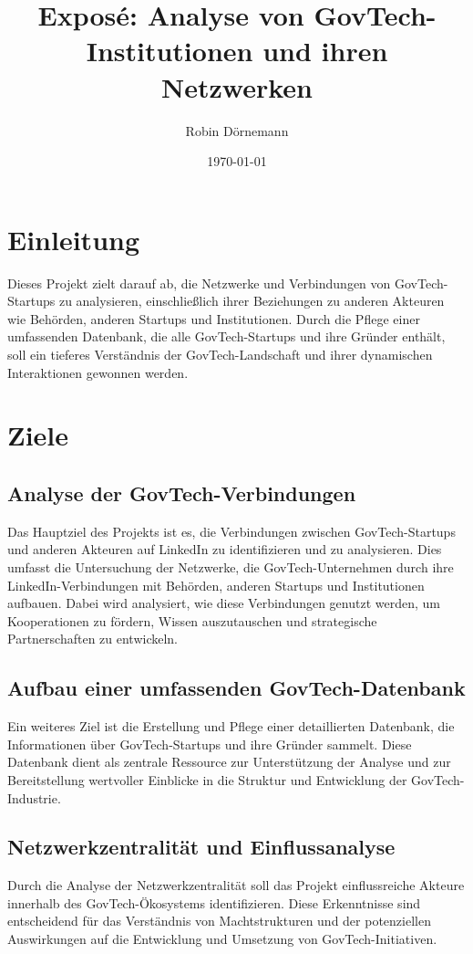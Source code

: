 \documentclass[a4paper,12pt]{article}
\title{Exposé: Analyse von GovTech-Institutionen und ihren Netzwerken}
\author{Robin Dörnemann}
\date{\today}
\begin{document}
\maketitle

\section{Einleitung}
Dieses Projekt zielt darauf ab, die Netzwerke und Verbindungen von GovTech-Startups zu analysieren, einschließlich ihrer Beziehungen zu anderen Akteuren wie Behörden, anderen Startups und Institutionen. Durch die Pflege einer umfassenden Datenbank, die alle GovTech-Startups und ihre Gründer enthält, soll ein tieferes Verständnis der GovTech-Landschaft und ihrer dynamischen Interaktionen gewonnen werden.

\section{Ziele}
\subsection*{Analyse der GovTech-Verbindungen}
Das Hauptziel des Projekts ist es, die Verbindungen zwischen GovTech-Startups und anderen Akteuren auf LinkedIn zu identifizieren und zu analysieren. Dies umfasst die Untersuchung der Netzwerke, die GovTech-Unternehmen durch ihre LinkedIn-Verbindungen mit Behörden, anderen Startups und Institutionen aufbauen. Dabei wird analysiert, wie diese Verbindungen genutzt werden, um Kooperationen zu fördern, Wissen auszutauschen und strategische Partnerschaften zu entwickeln.

\subsection*{Aufbau einer umfassenden GovTech-Datenbank}
Ein weiteres Ziel ist die Erstellung und Pflege einer detaillierten Datenbank, die Informationen über GovTech-Startups und ihre Gründer sammelt. Diese Datenbank dient als zentrale Ressource zur Unterstützung der Analyse und zur Bereitstellung wertvoller Einblicke in die Struktur und Entwicklung der GovTech-Industrie.

\subsection*{Netzwerkzentralität und Einflussanalyse}
Durch die Analyse der Netzwerkzentralität soll das Projekt einflussreiche Akteure innerhalb des GovTech-Ökosystems identifizieren. Diese Erkenntnisse sind entscheidend für das Verständnis von Machtstrukturen und der potenziellen Auswirkungen auf die Entwicklung und Umsetzung von GovTech-Initiativen.
\end{document}
